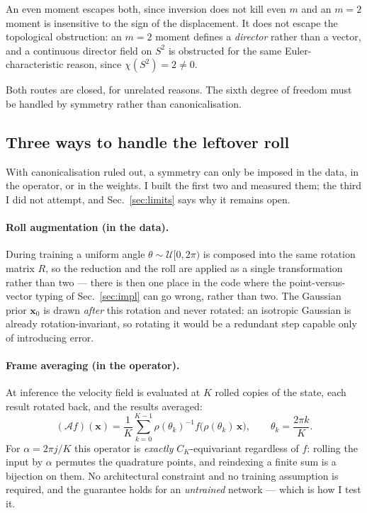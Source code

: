 \documentclass[11pt,a4paper]{article}
\begin{document}
An even moment escapes both, since inversion does not kill even $m$ and an $m=2$
moment is insensitive to the sign of the displacement. It does not escape the
topological obstruction: an $m=2$ moment defines a \emph{director} rather than a
vector, and a continuous director field on $S^2$ is obstructed for the same
Euler-characteristic reason, since $\chi(S^2) = 2 \neq 0$.

Both routes are closed, for unrelated reasons. The sixth degree of freedom must
be handled by symmetry rather than canonicalisation.

\subsection{Three ways to handle the leftover roll}
\label{sec:sixth}

With canonicalisation ruled out, a symmetry can only be imposed in the data, in
the operator, or in the weights. I built the first two and measured them; the
third I did not attempt, and Sec.~\ref{sec:limits} says why it remains open.

\paragraph{Roll augmentation (in the data).} During training a uniform angle
$\theta \sim \mathcal{U}[0, 2\pi)$ is composed into the same rotation matrix $R$,
so the reduction and the roll are applied as a single transformation rather than
two --- there is then one place in the code where the point-versus-vector typing
of Sec.~\ref{sec:impl} can go wrong, rather than two. The Gaussian prior
$\mathbf{x}_0$ is drawn \emph{after} this rotation and never rotated: an
isotropic Gaussian is already rotation-invariant, so rotating it would be a
redundant step capable only of introducing error.

\paragraph{Frame averaging (in the operator).} At inference the velocity field is
evaluated at $K$ rolled copies of the state, each result rotated back, and the
results averaged:
\begin{equation}
  (\mathcal{A}f)(\mathbf{x}) = \frac{1}{K} \sum_{k=0}^{K-1}
  \rho(\theta_k)^{-1} f\bigl(\rho(\theta_k)\,\mathbf{x}\bigr),
  \qquad \theta_k = \frac{2\pi k}{K} .
  \label{eq:fa}
\end{equation}
For $\alpha = 2\pi j/K$ this operator is \emph{exactly} $C_K$-equivariant
regardless of $f$: rolling the input by $\alpha$ permutes the quadrature points,
and reindexing a finite sum is a bijection on them. No architectural constraint
and no training assumption is required, and the guarantee holds for an
\emph{untrained} network --- which is how I test it.
\end{document}

